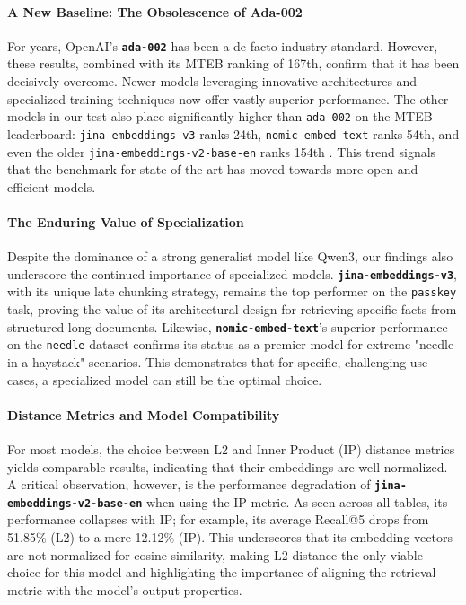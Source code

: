 \paragraph{A New Baseline: The Obsolescence of Ada-002}
For years, OpenAI's \textbf{\texttt{ada-002}} has been a de facto industry standard. However, these results, combined with its MTEB ranking of 167th, confirm that it has been decisively overcome. Newer models leveraging innovative architectures and specialized training techniques now offer vastly superior performance. The other models in our test also place significantly higher than \texttt{ada-002} on the MTEB leaderboard: \texttt{jina-embeddings-v3} ranks 24th, \texttt{nomic-embed-text} ranks 54th, and even the older \texttt{jina-embeddings-v2-base-en} ranks 154th \autocite{mteb_leaderboard_2025}. This trend signals that the benchmark for state-of-the-art has moved towards more open and efficient models.

\paragraph{The Enduring Value of Specialization}
Despite the dominance of a strong generalist model like Qwen3, our findings also underscore the continued importance of specialized models. \textbf{\texttt{jina-embeddings-v3}}, with its unique late chunking strategy, remains the top performer on the \texttt{passkey} task, proving the value of its architectural design for retrieving specific facts from structured long documents. Likewise, \textbf{\texttt{nomic-embed-text}}'s superior performance on the \texttt{needle} dataset confirms its status as a premier model for extreme "needle-in-a-haystack" scenarios. This demonstrates that for specific, challenging use cases, a specialized model can still be the optimal choice.

\paragraph{Distance Metrics and Model Compatibility}
For most models, the choice between L2 and Inner Product (IP) distance metrics yields comparable results, indicating that their embeddings are well-normalized. A critical observation, however, is the performance degradation of \textbf{\texttt{jina-embeddings-v2-base-en}} when using the IP metric. As seen across all tables, its performance collapses with IP; for example, its average Recall@5 drops from 51.85\% (L2) to a mere 12.12\% (IP). This underscores that its embedding vectors are not normalized for cosine similarity, making L2 distance the only viable choice for this model and highlighting the importance of aligning the retrieval metric with the model's output properties.

